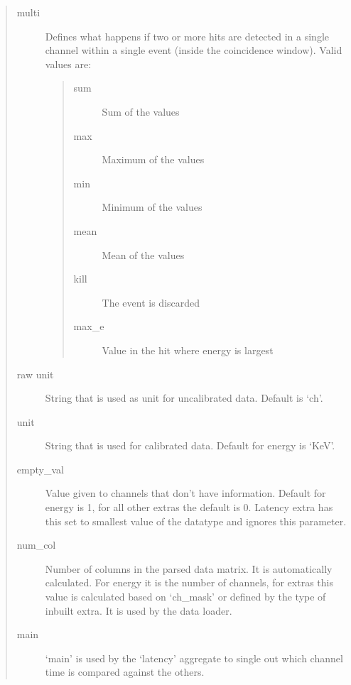 \documentclass[letterpaper,10pt,english]{sphinxmanual}
\begin{document}
\begin{quote}
\begin{description}
\begin{quote}
\begin{description}
\end{description}\end{quote}

\item[{multi}] \leavevmode
\sphinxAtStartPar
Defines what happens if two or more hits are detected in a single channel within a single
event (inside the coincidence window). Valid values are:
\begin{quote}\begin{description}
\item[{sum}] \leavevmode
\sphinxAtStartPar
Sum of the values

\item[{max}] \leavevmode
\sphinxAtStartPar
Maximum of the values

\item[{min}] \leavevmode
\sphinxAtStartPar
Minimum of the values

\item[{mean}] \leavevmode
\sphinxAtStartPar
Mean of the values

\item[{kill}] \leavevmode
\sphinxAtStartPar
The event is discarded

\item[{max\_e}] \leavevmode
\sphinxAtStartPar
Value in the hit where energy is largest

\end{description}\end{quote}

\item[{raw unit}] \leavevmode
\sphinxAtStartPar
String that is used as unit for uncalibrated data. Default is ‘ch’.

\item[{unit}] \leavevmode
\sphinxAtStartPar
String that is used for calibrated data. Default for energy is ‘KeV’.

\item[{empty\_val}] \leavevmode
\sphinxAtStartPar
Value given to channels that don’t have information. Default for energy is \sphinxhyphen{}1, for all
other extras the default is 0. Latency extra has this set to smallest value of the datatype
and ignores this parameter.

\item[{num\_col}] \leavevmode
\sphinxAtStartPar
Number of columns in the parsed data matrix. It is automatically calculated. For energy it is the number
of channels, for extras this value is calculated based on ‘ch\_mask’ or defined by the type of inbuilt
extra. It is used by the data loader.

\item[{main}] \leavevmode
\sphinxAtStartPar
‘main’ is used by the ‘latency’ aggregate to single out which channel time is compared against
the others.

\end{description}\end{quote}
\end{document}
